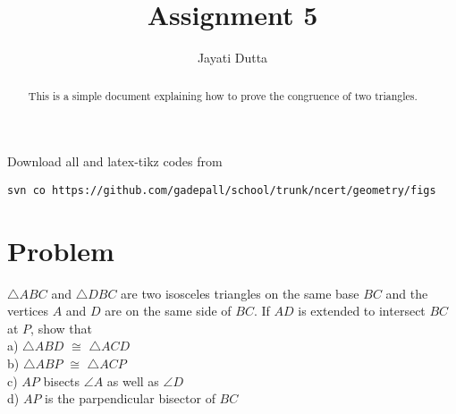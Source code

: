 \documentclass[journal,12pt,twocolumn]{IEEEtran}
\begin{document}
\let\StandardTheFigure\thefigure
\let\vec\mathbf
\renewcommand{\thefigure}{\theproblem}



\def\putbox#1#2#3{\makebox[0in][l]{\makebox[#1][l]{}\raisebox{\baselineskip}[0in][0in]{\raisebox{#2}[0in][0in]{#3}}}}
     \def\rightbox#1{\makebox[0in][r]{#1}}
     \def\centbox#1{\makebox[0in]{#1}}
     \def\topbox#1{\raisebox{-\baselineskip}[0in][0in]{#1}}
     \def\midbox#1{\raisebox{-0.5\baselineskip}[0in][0in]{#1}}

\vspace{3cm}

\title{Assignment 5}
\author{Jayati Dutta}





\maketitle

\newpage


\bigskip

\renewcommand{\thefigure}{\theenumi}
\renewcommand{\thetable}{\theenumi}


\begin{abstract}
This is a simple document explaining how to prove the congruence of two triangles.
\end{abstract}

%

Download all and latex-tikz codes from 
%
\begin{lstlisting}
svn co https://github.com/gadepall/school/trunk/ncert/geometry/figs
\end{lstlisting}
%


\section{Problem}
$\triangle ABC$ and $\triangle DBC$ are two isosceles triangles on the same base $BC$ and the vertices $A$ and $D$ are on the same side of $BC$. If $AD$ is extended to intersect $BC$ at $P$, show that \\
a) $\triangle ABD$ $\cong$ $\triangle ACD$ \\
b) $\triangle ABP$ $\cong$ $\triangle ACP$ \\
c) $AP$ bisects $\angle A$ as well as $\angle D$\\
d) $AP$ is the parpendicular bisector of $BC$
\end{document}
